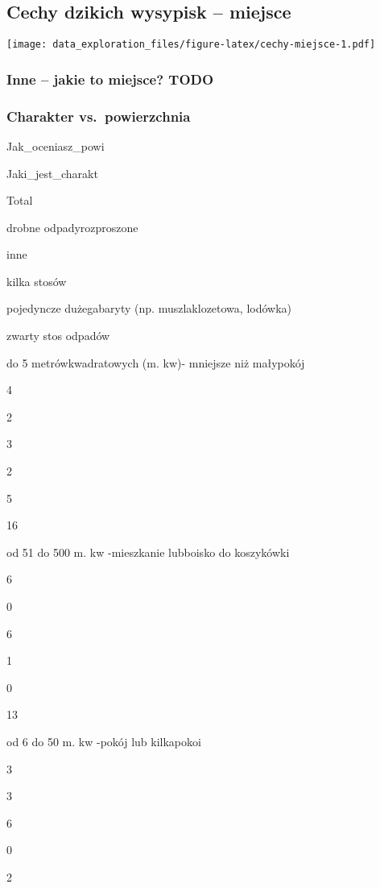 \documentclass[
]{article}
\begin{document}
\hypertarget{cechy-dzikich-wysypisk-miejsce}{%
\subsection{Cechy dzikich wysypisk --
miejsce}\label{cechy-dzikich-wysypisk-miejsce}}

\texttt{[image: data\_exploration\_files/figure-latex/cechy-miejsce-1.pdf]}

\hypertarget{inne-jakie-to-miejsce-todo}{%
\subsubsection{Inne -- jakie to miejsce?
TODO}\label{inne-jakie-to-miejsce-todo}}

\hypertarget{charakter-vs.-powierzchnia}{%
\subsubsection{Charakter
vs.~powierzchnia}\label{charakter-vs.-powierzchnia}}

Jak\_oceniasz\_powi

Jaki\_jest\_charakt

Total

drobne odpadyrozproszone

inne

kilka stosów

pojedyncze dużegabaryty (np. muszlaklozetowa, lodówka)

zwarty stos odpadów

do 5 metrówkwadratowych (m. kw)- mniejsze niż małypokój

{4}

{2}

{3}

{2}

{5}

{16}

od 51 do 500 m. kw -mieszkanie lubboisko do koszykówki

{6}

{0}

{6}

{1}

{0}

{13}

od 6 do 50 m. kw -pokój lub kilkapokoi

{3}

{3}

{6}

{0}

{2}
\end{document}
